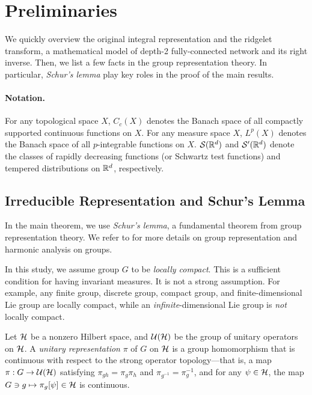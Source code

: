 \section{Preliminaries}
We quickly overview the original integral representation and the ridgelet transform, a mathematical model of depth-2 fully-connected network and its right inverse. Then, we list a few facts in the group representation theory.
In particular, \emph{Schur's lemma} play key roles in the proof of the main results.

\paragraph{Notation.}
For any topological space $X$, $C_c(X)$ denotes the Banach space of all compactly supported continuous functions on $X$.
For any measure space $X$, $L^p(X)$ denotes the Banach space of all $p$-integrable functions on $X$.
$\mathcal{S}(\mathbb{R}^d)$ and $\mathcal{S}'(\mathbb{R}^d)$ denote the classes of rapidly decreasing functions (or Schwartz test functions) and tempered distributions on $\mathbb{R}^d$, respectively. 



\subsection{Irreducible Representation and Schur's Lemma}
In the main theorem, we use \emph{Schur's lemma}, a fundamental theorem from group representation theory. 
We refer to \citet{Folland2015} for more details on group representation and harmonic analysis on groups.

In this study, we assume group $G$ to be \emph{locally compact}. This is a sufficient condition for having invariant measures. It is not a strong assumption. For example, any finite group, discrete group, compact group, and finite-dimensional Lie group are locally compact, while an \emph{infinite}-dimensional Lie group is \emph{not} locally compact.

Let $\mathcal{H}$ be a nonzero Hilbert space, and
$\mathcal{U}(\mathcal{H})$ be the group of unitary operators on $\mathcal{H}$. A \emph{unitary representation} $\pi$ of $G$ on $\mathcal{H}$ is a group homomorphism that is continuous with respect to the strong operator topology---that is, 
a map $\pi : G \to \mathcal{U}(\mathcal{H})$ satisfying $\pi_{gh} = \pi_g\pi_h$ and $\pi_{g^{-1}}=\pi_g^{-1}$, and for any $\psi \in \mathcal{H}$, the map $G \ni g \mapsto \pi_g[\psi] \in \mathcal{H}$ is continuous.

